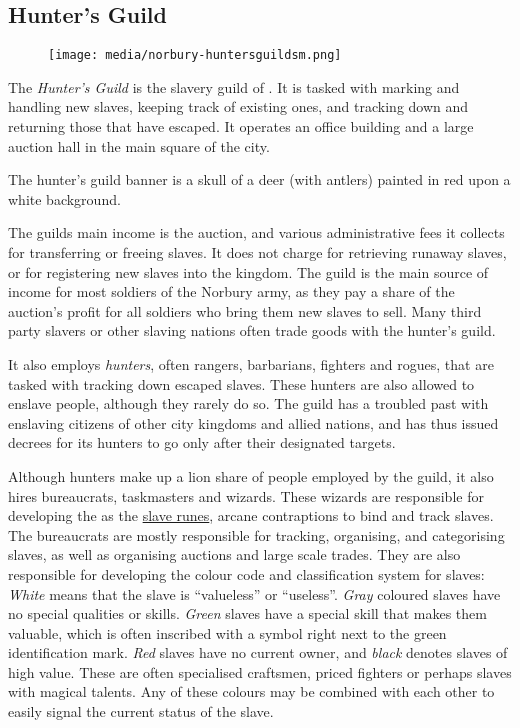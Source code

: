 \subsection{Hunter's Guild}
\label{sec:Hunters Guild}

\begin{figure}[!ht]
  \centering
  \texttt{[image: media/norbury-huntersguildsm.png]}
\end{figure}

The \emph{Hunter's Guild} is the slavery guild of . It is
tasked with marking and handling new slaves, keeping track of existing ones,
and tracking down and returning those that have escaped. It operates an office
building and a large auction hall in the main square of the city.

The hunter's guild banner is a skull of a deer (with antlers) painted in red
upon a white background.

The guilds main income is the auction, and various administrative fees it
collects for transferring or freeing slaves. It does not charge for retrieving
runaway slaves, or for registering new slaves into the kingdom. The guild is
the main source of income for most soldiers of the Norbury army, as they pay a
share of the auction's profit for all soldiers who bring them new slaves to
sell. Many third party slavers or other slaving nations often trade goods with
the hunter's guild.

It also employs \emph{hunters}, often rangers, barbarians, fighters and
rogues, that are tasked with tracking down escaped slaves. These hunters are
also allowed to enslave people, although they rarely do so. The guild
has a troubled past with enslaving citizens of other city kingdoms and allied
nations, and has thus issued decrees for its hunters to go only after their
designated targets.

Although hunters make up a lion share of people employed by the guild, it also
hires bureaucrats, taskmasters and wizards. These wizards are responsible for
developing the  as the \hyperref[sec:Slave Mark]{slave
  runes}, arcane contraptions to bind and track slaves. The bureaucrats are
mostly responsible for tracking, organising, and categorising slaves, as well
as organising auctions and large scale trades. They are also responsible for
developing the colour code and classification system for slaves: \emph{White}
means that the slave is ``valueless'' or ``useless''. \emph{Gray} coloured
slaves have no special qualities or skills. \emph{Green} slaves have a special
skill that makes them valuable, which is often inscribed with a symbol right
next to the green identification mark. \emph{Red} slaves have no current
owner, and \emph{black} denotes slaves of high value. These are often
specialised craftsmen, priced fighters or perhaps slaves with magical
talents. Any of these colours may be combined with each other to easily signal
the current status of the slave.

